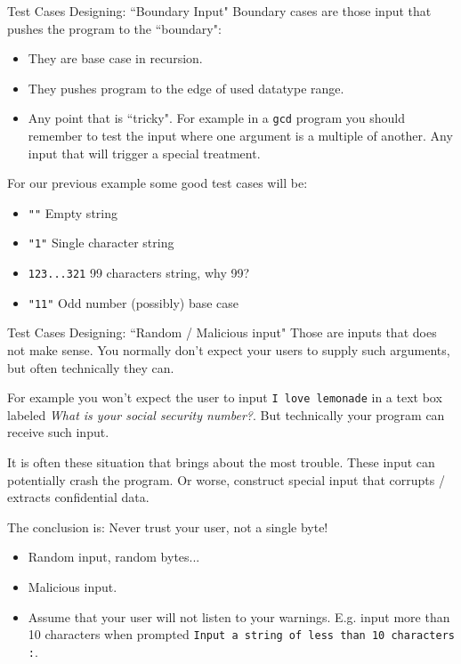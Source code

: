 \begin{frame}{Test Cases Designing: ``Boundary Input"}
Boundary cases are those input that pushes the program to the ``boundary":
\begin{itemize}
	\item They are base case in recursion. 
	\item They pushes program to the edge of used datatype range.
	\item Any point that is ``tricky". For example in a \texttt{gcd} program you should remember to test the input where one argument is a multiple of another. Any input that will trigger a special treatment.
\end{itemize}
For our previous example some good test cases will be:
\begin{itemize}
	\item \texttt{""} Empty string
	\item \texttt{"1"} Single character string
	\item \texttt{123...321} 99 characters string, why 99?
	\item \texttt{"11"} Odd number (possibly) base case
\end{itemize}
\end{frame}

\begin{frame}{Test Cases Designing: ``Random / Malicious input"}
Those are inputs that does not make sense. You normally don't expect your users to supply such arguments, but often technically they can. 

For example you won't expect the user to input \texttt{I love lemonade} in a text box labeled \textit{What is your social security number?}. But technically your program can receive such input. 

It is often these situation that brings about the most trouble. These input can potentially crash the program. Or worse, construct special input that corrupts / extracts confidential data.

The conclusion is: \alert{Never trust your user, not a single byte!}
\begin{itemize}
	\item Random input, random bytes...
	\item Malicious input. 
	\item Assume that your user will not listen to your warnings. E.g. input more than 10 characters when prompted \texttt{Input a string of less than 10 characters :}.
\end{itemize}
\end{frame}

